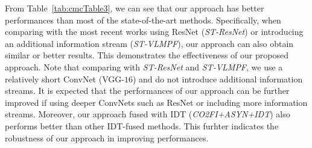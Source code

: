 \documentclass[letterpaper]{article}
\begin{document}
From Table~\ref{tab:cmcTable3}, we can see that our approach has better performances than most of the state-of-the-art methods. Specifically, when comparing with the most recent works using ResNet (\emph{ST-ResNet}) or introducing an additional information stream (\emph{ST-VLMPF}), our approach can also obtain similar or better results. This demonstrates the effectiveness of our proposed approach. Note that comparing with \emph{ST-ResNet} and \emph{ST-VLMPF}, we use a relatively short ConvNet (VGG-$16$) and do not introduce additional information streams. It is expected that the performances of our approach can be further improved if using deeper ConvNets such as ResNet or including more information streams. Moreover, our approach fused with IDT (\emph{CO2FI+ASYN+IDT}) also performs better than other IDT-fused methods. This furhter indicates the robustness of our approach in improving performances.
\end{document}
